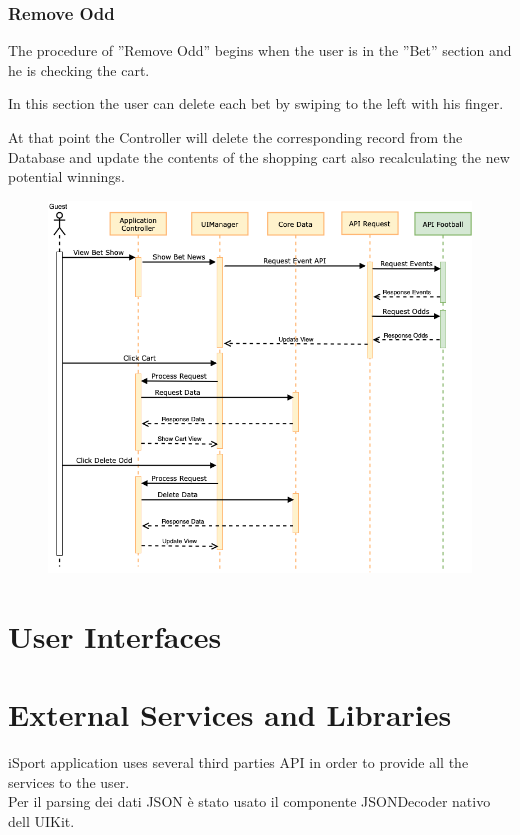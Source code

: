 \documentclass[numbers=noenddot, 12pt, a4paper, oneside]{scrbook}
\begin{document}
\subsection*{Remove Odd}
The procedure of  ”Remove Odd” begins when the user is in the ”Bet” section and he is checking the cart.

In this section the user can delete each bet by swiping to the left with his finger.

At that point the Controller will delete the corresponding record from the Database and update the contents of the shopping cart also recalculating the new potential winnings.
\begin{figure}[H]
	\centering
	\includegraphics[width=1\textwidth]{images/Sequence/SequenceRemoveOdd}
\end{figure}




\chapter{User Interfaces}
\chapter{External Services and Libraries}
iSport application uses several third parties API in order to provide all the services to the user.\\
Per il parsing dei dati JSON è stato usato il componente JSONDecoder nativo dell UIKit.
\end{document}
